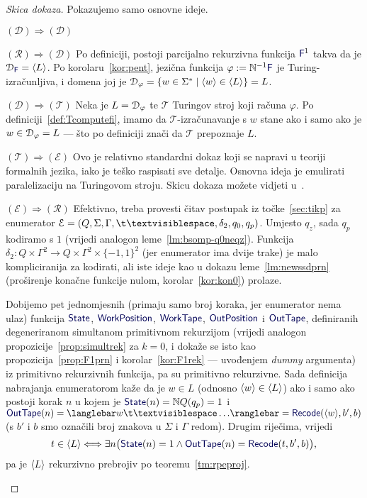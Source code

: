 \begin{proof}[Skica dokaza] Pokazujemo samo osnovne ideje.
\begin{labeling}{$(\mathcal D)\Rightarrow(\mathcal D)$}
\item[$(\mathcal R)\Rightarrow(\mathcal D)$]
Po definiciji, postoji parcijalno rekurzivna funkcija $\f F^1$ takva da je $\dom{\f F}=\kr L$. Po korolaru~\ref{kor:pent}, jezična funkcija $\varphi:=\N^{-1}\f F$ je Turing-izračunljiva, i domena joj je $\mathcal D_{\varphi}=\{w\in\Sigma^*\mid\langle w\rangle\in\langle L\rangle\}=L$.

\item[$(\mathcal D)\Rightarrow(\mathcal T)$] 
Neka je $L=\mathcal D_{\varphi}$ te $\mathcal T$ Turingov stroj koji računa $\varphi$. Po definiciji~\ref{def:Tcomputefi}, imamo da $\mathcal T$-izračunavanje s $w$ stane ako i samo ako je $w\in\mathcal D_{\varphi}=L$ --- što po definiciji znači da $\mathcal T$ prepoznaje $L$.

\item[$(\mathcal T)\Rightarrow(\mathcal E)$] 
Ovo je relativno standardni dokaz koji se napravi u teoriji formalnih jezika, iako je teško raspisati sve detalje. Osnovna ideja je emulirati paralelizaciju na Turingovom stroju. Skicu dokaza možete vidjeti u~\cite[\emph{theorem}~3.21]{sipser}.

\item[$(\mathcal E)\Rightarrow(\mathcal R)$] 
Efektivno, treba provesti čitav postupak iz točke~\ref{sec:tikp} za enumerator $\mathcal E=(Q,\Sigma,\Gamma,\bl,\delta_2,q_0,q_p)$. Umjesto $q_z$, sada $q_p$ kodiramo s $1$ (vrijedi analogon leme~\ref{lm:bsomp-q0neqz}). Funkcija $\delta_2:Q\times\Gamma^2\to Q\times\Gamma^2\times\{-1,1\}^2$ (jer enumerator ima dvije trake) je malo kompliciranija za kodirati, ali iste ideje kao u dokazu leme~\ref{lm:newssdprn} (proširenje konačne funkcije nulom, korolar~\ref{kor:kon0}) prolaze.

Dobijemo pet jednomjesnih (primaju samo broj koraka, jer enumerator nema ulaz) funkcija $\f{State}$, $\f{WorkPosition}$, $\f{WorkTape}$, $\f{OutPosition}$ i $\f{OutTape}$, definiranih degeneriranom simultanom primitivnom rekurzijom (vrijedi analogon propozicije~\ref{prop:simultrek} za $k=0$, i dokaže se isto kao propozicija~\ref{prop:F1prn} i korolar~\ref{kor:F1rek} --- uvođenjem \emph{dummy} argumenta) iz primitivno rekurzivnih funkcija, pa su primitivno rekurzivne. Sada definicija nabrajanja enumeratorom kaže da je $w\in L$ (odnosno $\langle w\rangle\in\langle L\rangle$) ako i samo ako postoji korak $n$ u kojem je $\f{State}(n)=\N Q(q_p)=1$ i $\f{OutTape}(n)=\knk{w\bl\ldots}=\f{Recode}(\kr w,b',b)$ (s $b'$ i $b$ smo označili broj znakova u $\Sigma$ i $\Gamma$ redom). Drugim riječima, vrijedi
\begin{equation}
    t\in\kr L\Longleftrightarrow\exists n\bigl(\f{State}(n)=1\land\f{OutTape}(n)=\f{Recode}(t,b',b)\bigr)\text,
\end{equation}
pa je $\langle L\rangle$ rekurzivno prebrojiv po teoremu~\ref{tm:rpeproj}.\qedhere
\end{labeling}
\end{proof}
